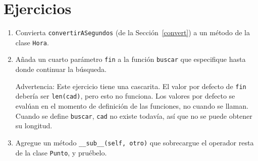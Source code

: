\section{Ejercicios}
\begin{enumerate}
\item Convierta \texttt{convertirASegundos} (de la Sección~\ref{convert})
a un método de la clase \texttt{Hora}.
\item Añada un cuarto parámetro \texttt{fin} a la función \texttt{buscar}
que especifique hasta donde continuar la búsqueda.

Advertencia: Este ejercicio tiene una cascarita. El valor por defecto
de \texttt{fin} debería ser \texttt{len(cad)}, pero esto no funciona.
Los valores por defecto se evalúan en el momento de definición de
las funciones, no cuando se llaman. Cuando se define \texttt{buscar},
\texttt{cad} no existe todavía, así que no se puede obtener su longitud.
\item Agregue un método \texttt{\_\_sub\_\_(self, otro)} que sobrecargue
el operador resta de la clase \texttt{Punto}, y pruébelo.
\end{enumerate}

